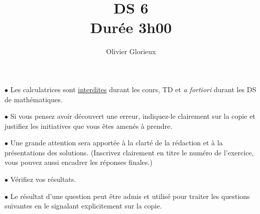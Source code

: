 \documentclass[a4paper, 11pt,reqno]{article}
\author{Olivier Glorieux}
\begin{document}
\title{DS 6\\
\Large{Durée 3h00}
}

\vspace{1cm}
\begin{center}

\begin{description}
\item$\bullet$ Les calculatrices sont \underline{interdites} durant les cours, TD et \emph{a fortiori} durant les DS de mathématiques. \\

\item $\bullet $ Si vous pensez avoir découvert une erreur, indiquez-le clairement sur la copie et justifiez les initiatives que vous êtes amenés à prendre. \\

\item $\bullet$ Une grande attention sera apportée à la clarté de la rédaction et à la présentations des solutions. (Inscrivez clairement en titre le numéro de l'exercice, vous pouvez aussi encadrer les réponses finales.)  \\

\item $\bullet$ Vérifiez vos résultats. \\

\item $\bullet$ Le résultat d'une question peut être admis et utilisé pour traiter les questions suivantes en le signalant explicitement sur la copie. 
\end{description}

\end{center} 
\vspace{1cm}




\newpage
\end{document}
